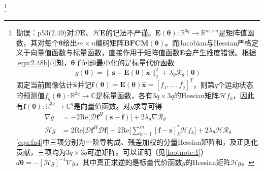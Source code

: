 \documentclass[12pt]{article}
\begin{document}
\footnote{勘误：p53(2.49)对$\mathcal{D}\mathbf{E}$、$\mathcal{H}\mathbf{E}$的记法不严谨。$\mathbf{E}(\bm{\theta}):\mathbb{R}^{3q}\to\mathbb{R}^{m\times n}$是矩阵值函数，其对每个$\bm{\theta}$给出$m\times n$编码矩阵$\mathbf{B}\mathbf{F}\mathbf{C}\mathbf{M}(\bm{\theta})$。而Jacobian与Hessian严格定义于向量值函数与标量函数，直接作用于矩阵值函数$\mathbf{E}$会产生维度错误。根据\autoref{equ:2.48b}可知，$\bm{\theta}$子问题最小化的是标量代价函数
\begin{equation}
    g(\bm{\theta})=\|\bm{s}-\mathbf{E}(\bm{\theta})\hat{\bm{x}}\|_2^2+\lambda_\theta\mathcal{R}_\theta(\bm{\theta})
\end{equation}
固定当前图像估计$\hat{\bm{x}}$并记$\bm{f}(\bm{\theta})=\mathbf{E}(\bm{\theta})\hat{\bm{x}}=[f_1,\ldots,f_q]^T$，则第$q$个运动状态的预测值$f_q(\bm{\theta}):\mathbb{R}^{3q}\to\mathbb{C}$是标量函数，各有$3q\times3q$的Hessian矩阵$\mathcal{H}f_k$，因此有$\bm{f}(\bm{\theta}):\mathbb{R}^{3q}\to\mathbb{C}^q$是向量值函数。对$g$求导可得
\begin{align}
    \nabla g&=-2\mathrm{Re}\big[\mathcal{D}\bm{f}^H(\bm{s}-\bm{f})\big]+2\lambda_\theta\nabla\mathcal{R}_\theta \\
    \mathcal{H}g&=2\mathrm{Re}\big[\mathcal{D}\bm{f}^H\mathcal{D}\bm{f}\big]+2\mathrm{Re}\big[\sum_{k=1}^{m}[\bm{f}-\bm{s}]_k^*\mathcal{H}f_k\big]+2\lambda_\theta\mathcal{H}\mathcal{R}_\theta \label{equ:fn4}
\end{align}
\autoref{equ:fn4}中三项分别为一阶导构成、残差加权的分量Hessian矩阵和，及正则化贡献，三项均为$3q\times3q$可逆矩阵。可以证明（见\autoref{footnote:1}）$d\bm{\theta}=-[\mathcal{H}g]^{-1}\nabla g$，其中真正求逆的是标量代价函数$g$的Hessian矩阵$\mathcal{H}g$。

}
\end{document}
